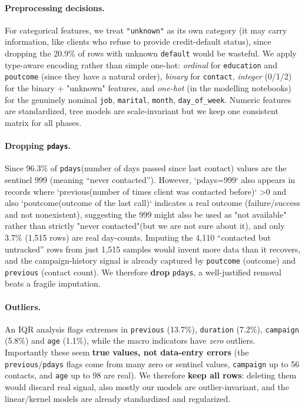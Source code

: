 \documentclass[11pt]{article}
\begin{document}
\paragraph{Preprocessing decisions.} For categorical features, we treat \texttt{"unknown"} as its own category (it may carry
information, like clients who refuse to provide credit-default status), since dropping the 20.9\% of
rows with unknown \texttt{default} would be wasteful. We apply type-aware encoding rather than simple
one-hot: \emph{ordinal} for \texttt{education} and \texttt{poutcome} (since they have a natural order),
\emph{binary} for \texttt{contact}, \emph{integer} (0/1/2) for the binary + "unknown" features, and
\emph{one-hot} (in the modelling notebooks) for the genuinely nominal \texttt{job}, \texttt{marital},
\texttt{month}, \texttt{day\_of\_week}. Numeric features are standardized, tree models are scale-invariant but we
keep one consistent matrix for all phases.

\paragraph{Dropping \texttt{pdays}.} Since 96.3\% of \texttt{pdays}(number of days passed since last contact) values are the sentinel $999$
(meaning ``never contacted''). However, `pdays=999` also appears in records where `previous(number of times client was contacted before)` \textgreater 0 and also `poutcome(outcome of the last call)` indicates a real outcome (failure/success and not nonexistent), suggesting the 999 might also be used as "not available" rather than strictly "never contacted"(but we are not sure about it), and only 3.7\% (1{,}515 rows) are real day-counts. Imputing the 4{,}110 ``contacted but untracked'' rows from just 1{,}515 samples would invent more data than it recovers, and the
campaign-history signal is already captured by \texttt{poutcome} (outcome) and \texttt{previous}
(contact count). We therefore \textbf{drop} \texttt{pdays}, a well-justified removal beats a fragile imputation.

\paragraph{Outliers.} An IQR analysis flags extremes in \texttt{previous}
(13.7\%), \texttt{duration} (7.2\%), \texttt{campaign} (5.8\%) and \texttt{age} (1.1\%), while the macro
indicators have \emph{zero} outliers. Importantly these seem \textbf{true values, not data-entry errors} (the \texttt{previous}/\texttt{pdays} flags come from many zero or sentinel values, \texttt{campaign} up to 56 contacts, and \texttt{age} up to 98 are real). We therefore \textbf{keep all rows}: deleting them would discard real signal, also mostly our models are outlier-invariant, and the linear/kernel models are already standardized and regularized.
\end{document}
